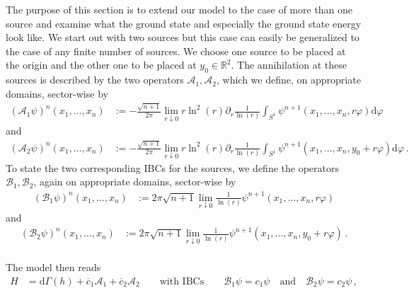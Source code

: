 The purpose of this section is to extend our model to the case of more than one source and examine what the ground state and especially the ground state energy look like. We start out with two sources but this case can easily be generalized to the case of any finite number of sources. We choose one source to be placed at the origin and the other one to be placed at $y_{0} \in \mathbb{R}^{2}$. The annihilation at these sources is described by the two operators $\mathcal{A}_{1},\mathcal{A}_{2}$, which we define, on appropriate domains, sector-wise by
\begin{align*}
  (\mathcal{A}_{1}\psi)^{n}
  \left(
    x_{1}
    ,
    \dots
    ,
    x_{n}
  \right)
  &:=
  -
  \frac{\sqrt{n + 1}}{2\pi}
  \lim_{r \downarrow 0}
  r\ln^{2}(r)
  \partial_{r}
  \frac{1}{\ln(r)}
  \int_{S^{1}}
  \psi^{n + 1}
  \left(
    x_{1}
    ,
    \dots
    ,
    x_{n}
    ,
    r\varphi
  \right)
  \mathrm{d}\varphi
\end{align*}
and
\begin{align*}
  (\mathcal{A}_{2}\psi)^{n}
  \left(
    x_{1}
    ,
    \dots
    ,
    x_{n}
  \right)
  &:=
  -
  \frac{\sqrt{n + 1}}{2\pi}
  \lim_{r \downarrow 0}
  r\ln^{2}(r)
  \partial_{r}
  \frac{1}{\ln(r)}
  \int_{S^{1}}
  \psi^{n + 1}
  \left(
    x_{1}
    ,
    \dots
    ,
    x_{n}
    ,
    y_{0}
    +
    r\varphi
  \right)
  \mathrm{d}\varphi
  \,.
\end{align*}
To state the two corresponding IBCs for the sources, we define the operators $\mathcal{B}_{1},\mathcal{B}_{2}$, again on appropriate domains, sector-wise by
\begin{align*}
  (\mathcal{B}_{1}\psi)^{n}
  \left(
    x_{1}
    ,
    \dots
    ,
    x_{n}
  \right)
  &:=
  2\pi
  \sqrt{n + 1}
  \lim_{r \downarrow 0}
  \frac{1}{\ln(r)}
  \psi^{n + 1}
  \left(
    x_{1}
    ,
    \dots
    ,
    x_{n}
    ,
    r\varphi
  \right)
\end{align*}
and
\begin{align*}
  (\mathcal{B}_{2}\psi)^{n}
  \left(
    x_{1}
    ,
    \dots
    ,
    x_{n}
  \right)
  &:=
  2\pi
  \sqrt{n + 1}
  \lim_{r \downarrow 0}
  \frac{1}{\ln(r)}
  \psi^{n + 1}
  \left(
    x_{1}
    ,
    \dots
    ,
    x_{n}
    ,
    y_{0}
    +
    r\varphi
  \right)
  \,.
\end{align*}
\\
The model then reads
\begin{align*}
  H
  &=
  \mathrm{d}\Gamma(h)
  +
  \overline{c}_{1}
  \mathcal{A}_{1}
  +
  \overline{c}_{2}
  \mathcal{A}_{2}
  \qquad
  \text{with IBCs}
  \qquad
  \mathcal{B}_{1}\psi
  =
  c_{1}\psi
  \quad
  \text{and}
  \quad
  \mathcal{B}_{2}\psi
  =
  c_{2}\psi
  \,,
\end{align*}
